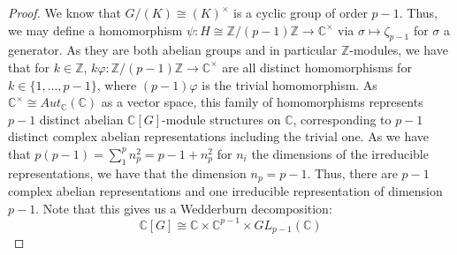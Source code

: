 \documentclass{article}
\newcommand{\bb}[1]{\mathbb{#1}}
\newcommand{\iso}{\cong}
\begin{document}
\begin{proof}
    We know that $G/(K) \iso (K)^{\times}$ is a cyclic group of order $p-1$. Thus, we may define a homomorphism $\psi: H \iso \bb{Z}/(p-1)\bb{Z} \to \bb{C}^{\times}$ via $\sigma \mapsto \zeta_{p-1}$ for $\sigma$ a generator. As they are both abelian groups and in particular $\bb{Z}$-modules, we have that for $k \in \bb{Z}$, $k\varphi:\bb{Z}/(p-1)\bb{Z} \to \bb{C}^{\times}$ are all distinct homomorphisms for $k \in \{1,...,p-1\}$, where $(p-1)\varphi$ is the trivial homomorphism. As $\bb{C}^{\times} \iso Aut_{\bb{C}}(\bb{C})$ as a vector space, this family of homomorphisms represents $p-1$ distinct abelian $\bb{C}[G]$-module structures on $\bb{C}$, corresponding to $p-1$ distinct complex abelian representations including the trivial one. As we have that $p(p-1) = \sum_{1}^{p}n_{p}^{2} = p-1 + n_{p}^{2}$ for $n_{i}$ the dimensions of the irreducible representations, we have that the dimension $n_{p} = p-1$. Thus, there are $p-1$ complex abelian representations and one irreducible representation of dimension $p-1$. Note that this gives us a Wedderburn decomposition:
    \[
      \bb{C}[G] \iso \bb{C} \times \bb{C}^{p-1} \times GL_{p-1}(\bb{C}) 
      \]
  \end{proof}
\end{document}
